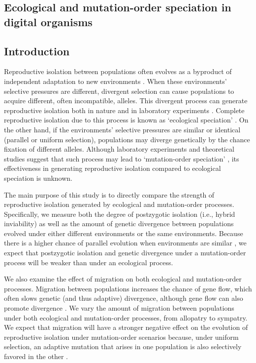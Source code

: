 \begin{doublespace}

\chapter{Ecological and mutation-order speciation in digital organisms}
\label{chap:ecol_mo}



\section{Introduction}

Reproductive isolation between populations
often evolves as a byproduct of independent adaptation
to new environments \citep{coy04,sch09,sob10}.
%
When these environments' selective pressures are different,
divergent selection can cause populations
to acquire different, often incompatible, alleles.
%
This divergent process can generate reproductive isolation
both in nature \citep[reviewed in][]{run05,sch09}
and in laboratory experiments \citetext{\citealp{det07,det08};
reviewed in \citealp{ric93} and \citealp{fry09}}.
%
Complete reproductive isolation due to this process
is known as `ecological speciation' \citep{sch09}.
%
On the other hand, if the environments' selective pressures
are similar or identical (parallel or uniform selection),
populations may diverge genetically
by the chance fixation of different alleles.
%
Although laboratory experiments and theoretical studies suggest that
such process may lead to `mutation-order speciation' \citep{sch09,nos11},
its effectiveness in generating reproductive isolation
compared to ecological speciation is unknown.



The main purpose of this study is to directly compare
the strength of reproductive isolation
generated by ecological and mutation-order processes.
%
Specifically, we measure both the degree of postzygotic isolation
(i.e., hybrid inviability)
as well as the amount of genetic divergence between populations
evolved under either different environments or the same environments.
%
Because there is a higher chance of parallel evolution
when environments are similar \citep{sch09b},
we expect that postzygotic isolation and genetic divergence
under a mutation-order process will be weaker than under an ecological process.



We also examine the effect of migration
on both ecological and mutation-order processes.
%
Migration between populations increases the chance of gene flow,
which often slows genetic (and thus adaptive) divergence,
although gene flow can also promote divergence \citep{gar06,ras08}.
%
We vary the amount of migration between populations
under both ecological and mutation-order processes,
from allopatry to sympatry.
%
We expect that migration will have a stronger negative effect
on the evolution of reproductive isolation under mutation-order scenarios
because, under uniform selection, an adaptive mutation
that arises in one population is also selectively
favored in the other \citep{sch09,nos09b,nos11}.




\end{doublespace}
